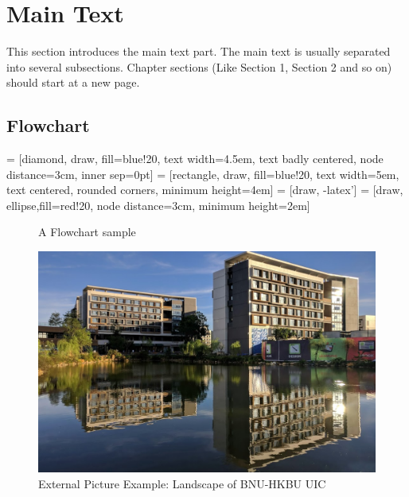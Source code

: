 \documentclass[12pt]{article}
\begin{document}
\section{Main  Text}
This section introduces the main text part. The main text is usually separated into several subsections. Chapter sections (Like Section 1, Section 2 and so on) should start at a new page.
\subsection{Flowchart}
 = [diamond, draw, fill=blue!20, 
    text width=4.5em, text badly centered, node distance=3cm, inner sep=0pt]
 = [rectangle, draw, fill=blue!20, 
    text width=5em, text centered, rounded corners, minimum height=4em]
 = [draw, -latex']
 = [draw, ellipse,fill=red!20, node distance=3cm,
    minimum height=2em]
\begin{figure}[h]
    \centering
    \caption{A Flowchart sample}
    \label{flowchart_sample}
\end{figure}
\begin{figure}[H]
    \centering
    \includegraphics[scale=0.2]{assets/uic-landscape.png}
    \caption{External Picture Example: Landscape of BNU-HKBU UIC}
    \label{uic_landscape_picture}
\end{figure}
\end{document}
